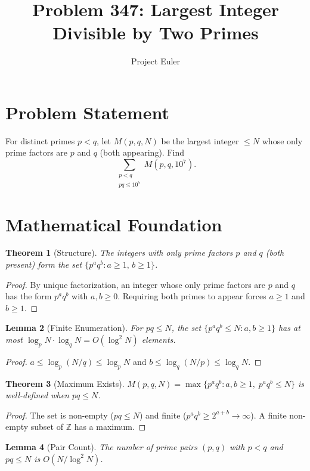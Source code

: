 \documentclass[a4paper,12pt]{article}
\title{Problem 347: Largest Integer Divisible by Two Primes}
\author{Project Euler}
\date{}
\newtheorem{theorem}{Theorem}
\newtheorem{lemma}[theorem]{Lemma}
\begin{document}
\maketitle

\section{Problem Statement}
For distinct primes $p < q$, let $M(p,q,N)$ be the largest integer $\le N$ whose only prime factors are $p$ and $q$ (both appearing). Find
\[
\sum_{\substack{p < q \\ pq \le 10^7}} M(p, q, 10^7).
\]

\section{Mathematical Foundation}

\begin{theorem}[Structure]
The integers with only prime factors $p$ and $q$ (both present) form the set $\{p^a q^b : a \ge 1,\, b \ge 1\}$.
\end{theorem}

\begin{proof}
By unique factorization, an integer whose only prime factors are $p$ and $q$ has the form $p^a q^b$ with $a, b \ge 0$. Requiring both primes to appear forces $a \ge 1$ and $b \ge 1$.
\end{proof}

\begin{lemma}[Finite Enumeration]
For $pq \le N$, the set $\{p^a q^b \le N : a,b \ge 1\}$ has at most $\log_p N \cdot \log_q N = O(\log^2 N)$ elements.
\end{lemma}

\begin{proof}
$a \le \log_p(N/q) \le \log_p N$ and $b \le \log_q(N/p) \le \log_q N$.
\end{proof}

\begin{theorem}[Maximum Exists]
$M(p,q,N) = \max\{p^a q^b : a,b \ge 1,\; p^a q^b \le N\}$ is well-defined when $pq \le N$.
\end{theorem}

\begin{proof}
The set is non-empty ($pq \le N$) and finite ($p^a q^b \ge 2^{a+b} \to \infty$). A finite non-empty subset of $\mathbb{Z}$ has a maximum.
\end{proof}

\begin{lemma}[Pair Count]
The number of prime pairs $(p,q)$ with $p < q$ and $pq \le N$ is $O(N/\log^2 N)$.
\end{lemma}
\end{document}

